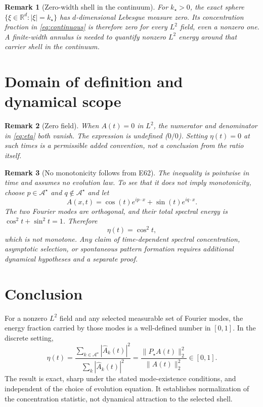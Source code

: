 \documentclass[11pt]{article}
\newtheorem{remark}{Remark}
\newcommand{\R}{\mathbb{R}}
\newcommand{\norm}[1]{\lVert #1\rVert}
\begin{document}
\begin{remark}[Zero-width shell in the continuum]
For $k_\star>0$, the exact sphere
$\{\xi\in\R^d:|\xi|=k_\star\}$ has $d$-dimensional Lebesgue
measure zero. Its concentration fraction in \eqref{eq:continuous}
is therefore zero for every $L^2$ field, even a nonzero one.
A finite-width annulus is needed to quantify nonzero $L^2$ energy
around that carrier shell in the continuum.
\end{remark}

\section{Domain of definition and dynamical scope}

\begin{remark}[Zero field]
When $A(t)=0$ in $L^2$, the numerator and denominator in
\eqref{eq:eta} both vanish. The expression is undefined ($0/0$).
Setting $\eta(t)=0$ at such times is a permissible added convention,
not a conclusion from the ratio itself.
\end{remark}

\begin{remark}[No monotonicity follows from E62]
The inequality is pointwise in time and assumes no evolution
law. To see that it does not imply monotonicity, choose
$p\in\mathcal A^\star$ and $q\notin\mathcal A^\star$ and let
\[
A(x,t)=\cos(t)e^{ip\cdot x}+\sin(t)e^{iq\cdot x}.
\]
The two Fourier modes are orthogonal, and their total spectral energy
is $\cos^2t+\sin^2t=1$. Therefore
\[
\eta(t)=\cos^2t,
\]
which is not monotone. Any claim of time-dependent spectral
concentration, asymptotic selection, or spontaneous pattern formation
requires additional dynamical hypotheses and a separate proof.
\end{remark}

\section{Conclusion}

For a nonzero $L^2$ field and any selected measurable set of
Fourier modes, the energy fraction carried by those modes is a
well-defined number in $[0,1]$. In the discrete setting,
\[
\boxed{
\eta(t)
=\frac{\sum_{k\in\mathcal A^\star}|\widehat A_k(t)|^2}
{\sum_k|\widehat A_k(t)|^2}
=\frac{\norm{P_\star A(t)}_2^2}{\norm{A(t)}_2^2}
\in[0,1].}
\]
The result is exact, sharp under the stated mode-existence conditions,
and independent of the choice of evolution equation. It establishes
normalization of the concentration statistic, not dynamical attraction
to the selected shell.
\end{document}
